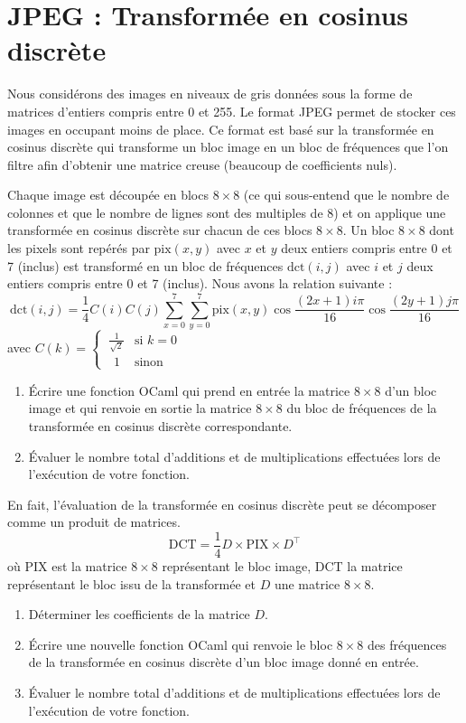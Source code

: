 \renewcommand{\SourceFile}{7-arithmetique-et-calculs-numeriques/src/7-5.ml}

\section{JPEG : Transformée en cosinus discrète}

Nous considérons des images en niveaux de gris données sous la forme de matrices d'entiers compris entre 0 et 255. Le format JPEG permet de stocker ces images en occupant moins de place. Ce format est basé sur la transformée en cosinus discrète qui transforme un bloc image en un bloc de fréquences que l'on filtre afin d'obtenir une matrice creuse (beaucoup de coefficients nuls).
\medskip

Chaque image est découpée en blocs $8 \times 8$ (ce qui sous-entend que le nombre de colonnes et que le nombre de lignes sont des multiples de 8) et on applique une transformée en cosinus discrète sur chacun de ces blocs $8 \times 8$. Un bloc $8 \times 8$ dont les pixels sont repérés par $\textrm{pix}(x,y)$ avec $x$ et $y$ deux entiers compris entre 0 et 7 (inclus) est transformé en un bloc de fréquences $\textrm{dct}(i,j)$ avec $i$ et $j$ deux entiers compris entre 0 et 7 (inclus). Nous avons la relation suivante :
\[
    \textrm{dct}(i,j) = \frac{1}{4}C(i)C(j)\sum_{x=0}^7\sum_{y=0}^7\textrm{pix}(x,y)\cos\frac{(2x+1)i\pi}{16}\cos\frac{(2y+1)j\pi}{16}
\]
avec $C(k) = \begin{cases}
      \ \frac{1}{\sqrt{2}} & \textrm{si } k=0 \\
      \ \ \, 1 & \textrm{sinon}
    \end{cases}$

\Q
\begin{enumerate}
    \item Écrire une fonction OCaml qui prend en entrée la matrice $8 \times 8$ d'un bloc image et qui renvoie en sortie la matrice $8 \times 8$ du bloc de fréquences de la transformée en cosinus discrète correspondante.
    \item Évaluer le nombre total d'additions et de multiplications effectuées lors de l'exécution de votre fonction.
\end{enumerate}

\Q
En fait, l'évaluation de la transformée en cosinus discrète peut se décomposer comme un produit de matrices.
\[
    \textrm{DCT}=\frac{1}{4}D\times\textrm{PIX}\times D^\top
\]
où PIX est la matrice $8 \times 8$ représentant le bloc image, DCT la matrice représentant le bloc issu de la transformée et $D$ une matrice $8 \times 8$.
\begin{enumerate}
    \item Déterminer les coefficients de la matrice $D$.
    \item Écrire une nouvelle fonction OCaml qui renvoie le bloc $8 \times 8$ des fréquences de la transformée en cosinus discrète d'un bloc image donné en entrée.
    \item Évaluer le nombre total d'additions et de multiplications effectuées lors de l'exécution de votre fonction.
\end{enumerate}

